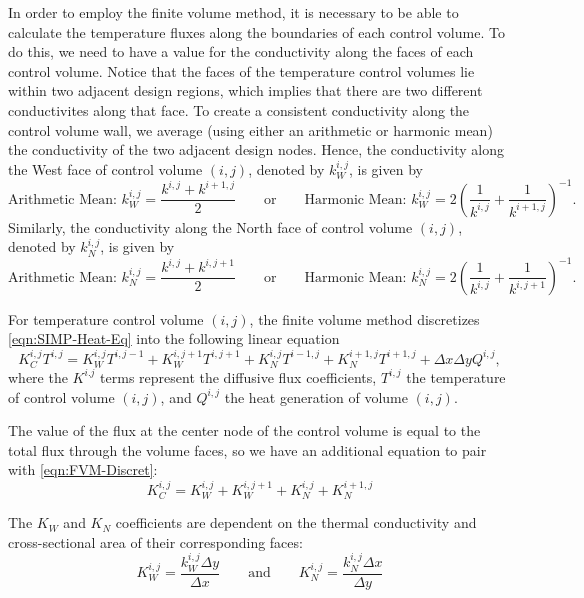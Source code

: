 In order to employ the finite volume method, it is necessary to be able to calculate the temperature fluxes along the boundaries of each control volume. To do this, we need to have a value for the conductivity along the faces of each control volume. Notice that the faces of the temperature control volumes lie within two adjacent design regions, which implies that there are two different conductivites along that face. To create a consistent conductivity along the control volume wall, we average (using either an arithmetic or harmonic mean) the conductivity of the two adjacent design nodes. Hence, the conductivity along the West face of control volume $(i,j)$, denoted by $k^{i,j}_W$, is given by
\begin{equation}
	\text{Arithmetic Mean: }k^{i,j}_W=\frac{k^{i,j}+k^{i+1,j}}{2}\qquad\text{or}\qquad\text{Harmonic Mean: }k^{i,j}_W=2\left(\frac{1}{k^{i,j}}+\frac{1}{k^{i+1,j}}\right)^{-1}.\label{eqn:k_W-Average-Filter}
\end{equation}
Similarly, the conductivity along the North face of control volume $(i,j)$, denoted by $k^{i,j}_N$, is given by
\begin{equation}
	\text{Arithmetic Mean: }k^{i,j}_N=\frac{k^{i,j}+k^{i,j+1}}{2}\qquad\text{or}\qquad\text{Harmonic Mean: }k^{i,j}_N=2\left(\frac{1}{k^{i,j}}+\frac{1}{k^{i,j+1}}\right)^{-1}.\label{eqn:k_N-Average-Filter}
\end{equation}

For temperature control volume $(i,j)$, the finite volume method discretizes \eqref{eqn:SIMP-Heat-Eq} into the following linear equation
\begin{equation}
	K^{i,j}_C T^{i,j}=K_W^{i,j}T^{i,j-1}+K_W^{i,j+1}T^{i,j+1}+K_N^{i,j}T^{i-1,j}+K_N^{i+1,j}T^{i+1,j}+\Delta x\Delta y Q^{i,j},\label{eqn:FVM-Discret}
\end{equation}
where the $K^{i.j}$ terms represent the diffusive flux coefficients, $T^{i,j}$ the temperature of control volume $(i,j)$, and $Q^{i,j}$ the heat generation of volume $(i,j)$.

The value of the flux at the center node of the control volume is equal to the total flux through the volume faces, so we have an additional equation to pair with \eqref{eqn:FVM-Discret}:
\begin{equation}
	K^{i,j}_C=K_W^{i,j}+K_W^{i,j+1}+K_N^{i,j}+K_N^{i+1,j}\label{eqn:CenterFluxCoeff}
\end{equation}

The $K_W$ and $K_N$ coefficients are dependent on the thermal conductivity and cross-sectional area of their corresponding faces:
\begin{equation}
	K_W^{i,j}=\frac{k_W^{i,j}\Delta y}{\Delta x}\qquad\text{and}\qquad K_N^{i,j}=\frac{k_N^{i,j}\Delta x}{\Delta y}\label{eqn:K-Coeffs}
\end{equation}

